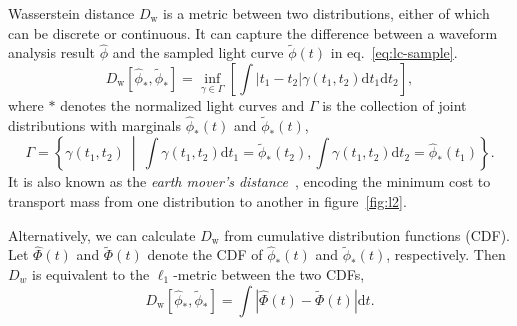 Wasserstein distance $D_\mathrm{w}$ is a metric between two distributions, either of which can be discrete or continuous. It can capture the difference between a waveform analysis result $\hat{\phi}$ and the sampled light curve $\tilde{\phi}(t)$ in eq.~\eqref{eq:lc-sample}.
\begin{equation}
  D_\mathrm{w}\left[\hat{\phi}_*, \tilde{\phi}_*\right] = \inf_{\gamma \in \Gamma} \left[\int \left\vert t_1 - t_2 \right\vert \gamma(t_1, t_2)\mathrm{d}t_1\mathrm{d}t_2\right],
\end{equation}
where $*$ denotes the normalized light curves and $\Gamma$ is the collection of joint distributions with marginals $\hat{\phi}_*(t)$ and $\tilde{\phi}_*(t)$,
\begin{equation*}
  \label{eq:joint}
  \Gamma = \left\{\gamma(t_1, t_2) ~\middle\vert~ \int\gamma(t_1,t_2)\mathrm{d}t_1 = \tilde{\phi}_*(t_2) , \int\gamma(t_1,t_2)\mathrm{d}t_2 = \hat{\phi}_*(t_1) \right\}.
\end{equation*}
It is also known as the \textit{earth mover's distance}~\cite{levina_earth_2001}, encoding the minimum cost to transport mass from one distribution to another in figure~\ref{fig:l2}.

Alternatively, we can calculate $D_\mathrm{w}$ from cumulative distribution functions (CDF). Let $\hat\Phi(t)$ and $\tilde\Phi(t)$ denote the CDF of $\hat{\phi}_*(t)$ and $\tilde{\phi}_*(t)$, respectively. Then $D_w$ is equivalent to the $\ell_1$-metric between the two CDFs,
\begin{equation}
    D_\mathrm{w}\left[\hat{\phi}_*, \tilde{\phi}_*\right] = \int\left|\hat{\Phi}(t) - \tilde{\Phi}(t)\right| \mathrm{d}t.
    \label{eq:numerical}
\end{equation}